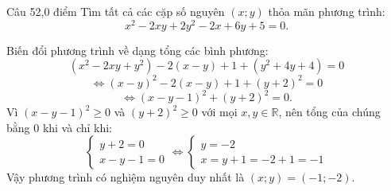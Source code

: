 \begin{de_cau}{Câu 5}{2,0 điểm}
Tìm tất cả các cặp số nguyên $(x; y)$ thỏa mãn phương trình:
\[x^2 - 2xy + 2y^2 - 2x + 6y + 5 = 0.\]
\end{de_cau}

\begin{loi_giai_cau}
Biến đổi phương trình về dạng tổng các bình phương:
\[(x^2 - 2xy + y^2) - 2(x - y) + 1 + (y^2 + 4y + 4) = 0\]
\[\iff (x - y)^2 - 2(x - y) + 1 + (y + 2)^2 = 0\]
\[\iff (x - y - 1)^2 + (y + 2)^2 = 0.\]
Vì $(x - y - 1)^2 \ge 0$ và $(y + 2)^2 \ge 0$ với mọi $x, y \in \mathbb{R}$, nên tổng của chúng bằng 0 khi và chỉ khi:
\[\begin{cases} y + 2 = 0 \\ x - y - 1 = 0 \end{cases} \iff \begin{cases} y = -2 \\ x = y + 1 = -2 + 1 = -1 \end{cases}\]
Vậy phương trình có nghiệm nguyên duy nhất là $\boxed{(x; y) = (-1; -2)}$.
\end{loi_giai_cau}
